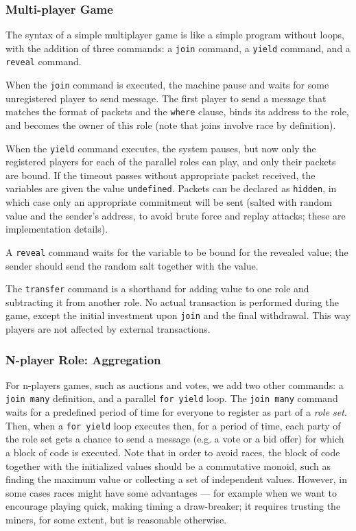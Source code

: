 \documentclass[acmsmall,review,anonymous]{acmart}\settopmatter{printfolios=true,printccs=false,printacmref=false}
\begin{document}
\subsubsection{Multi-player Game}
The syntax of a simple multiplayer game is like a simple program without loops, with the addition of three commands: a \texttt{join} command, a \texttt{yield} command, and a \texttt{reveal} command.

When the \texttt{join} command is executed, the machine pause and waits for some unregistered player to send message. The first player to send a message that matches the format of packets and the \texttt{where} clause, binds its address to the role, and becomes the owner of this role (note that joins involve race by definition).

When the \texttt{yield} command executes, the system pauses, but now only the registered players for each of the parallel roles can play, and only their packets are bound. If the timeout passes without appropriate packet received, the variables are given the value \texttt{undefined}. Packets can be declared as \texttt{hidden}, in which case only an appropriate commitment will be sent (salted with random value and the sender's address, to avoid brute force and replay attacks; these are implementation details).

A \texttt{reveal} command waits for the variable to be bound for the revealed value; the sender should send the random salt together with the value.

The \texttt{transfer} command is a shorthand for adding value to one role and subtracting it from another role. No actual transaction is performed during the game, except the initial investment upon \texttt{join} and the final withdrawal. This way players are not affected by external transactions. 

\subsubsection{N-player Role: Aggregation}

For n-players games, such as auctions and votes, we add two other commands: a \texttt{join many} definition, and a parallel \texttt{for yield} loop. The \texttt{join many} command waits for a predefined period of time for everyone to register as part of a \textit{role set}. Then, when a \texttt{for yield} loop executes then, for a period of time, each party of the role set gets a chance to send a message (e.g. a vote or a bid offer) for which a block of code is executed. Note that in order to avoid races, the block of code together with the initialized values should be a commutative monoid, such as finding the maximum value or collecting a set of independent values. However, in some cases races might have some advantages --- for example when we want to encourage playing quick, making timing a draw-breaker; it requires trusting the miners, for some extent, but is reasonable otherwise.
\end{document}
